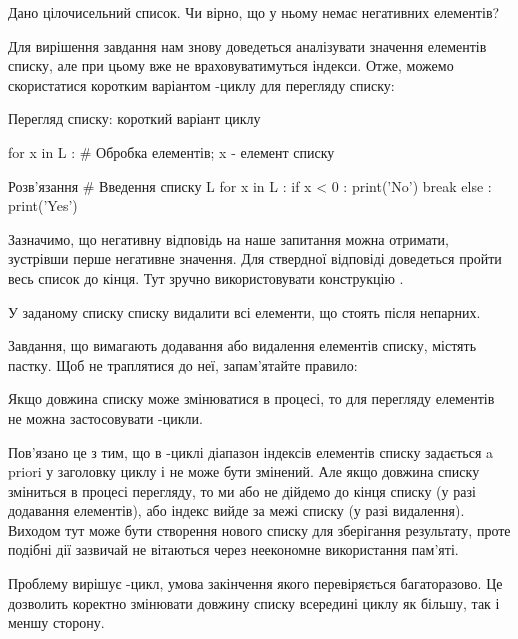 \begin{pr}{}
Дано цілочисельний список. Чи вірно, що у ньому немає негативних елементів?
\end{pr}

Для вирішення завдання нам знову доведеться аналізувати значення елементів списку, але при цьому вже не враховуватимуться індекси. Отже, можемо скористатися коротким варіантом -циклу для перегляду списку:
\begin{defn}{Перегляд списку: короткий варіант циклу}
\begin{py}{}
for x in L :
    # Обробка елементів; x - елемент списку
\end{py}
\end{defn}

\begin{py}{Розв'язання}
# Введення списку L
for x in L :
    if x < 0 :
        print('No')
        break
else :
    print('Yes')
\end{py}

Зазначимо, що негативну відповідь на наше запитання можна отримати, зустрівши перше негативне значення. Для ствердної відповіді доведеться пройти весь список до кінця. Тут зручно використовувати конструкцію .

\begin{pr}{}
У заданому списку списку видалити всі елементи, що стоять після непарних.
\end{pr}

Завдання, що вимагають додавання або видалення елементів списку, містять пастку. Щоб не траплятися до неї, запам'ятайте правило:
\begin{defn}{Якщо довжина списку може змінюватися в процесі,}
то для перегляду елементів не можна застосовувати -цикли.
\end{defn}

\noindent Пов'язано це з тим, що в -циклі діапазон індексів елементів списку задається a ~ priori у заголовку циклу і не може бути змінений. Але якщо довжина списку зміниться в процесі перегляду, то ми або не дійдемо до кінця списку (у разі додавання елементів), або індекс вийде за межі списку (у разі видалення). Виходом тут може бути створення нового списку для зберігання результату, проте подібні дії зазвичай не вітаються через неекономне використання пам'яті.

Проблему вирішує -цикл, умова закінчення якого перевіряється багаторазово. Це дозволить коректно змінювати довжину списку всередині циклу як більшу, так і меншу сторону.

